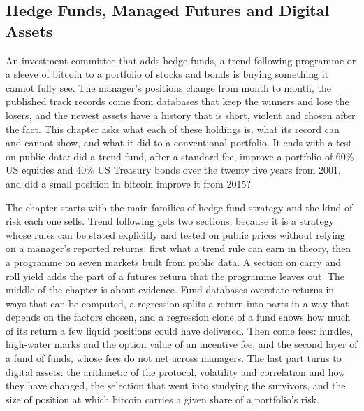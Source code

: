 
\begin{chapterrefs}
\setcounter{chapter}{8}
\chapter{Hedge Funds, Managed Futures and Digital Assets}
\label{ch:hedge}

An investment committee that adds hedge funds, a trend following programme or a sleeve of bitcoin to
a portfolio of stocks and bonds is buying something it cannot fully see. The manager's positions
change from month to month, the published track records come from databases that keep the winners
and lose the losers, and the newest assets have a history that is short, violent and chosen after the
fact. This chapter asks what each of these holdings is, what its record can and cannot show, and what
it did to a conventional portfolio. It ends with a test on public data: did a trend fund, after a
standard fee, improve a portfolio of 60\% US equities and 40\% US Treasury bonds over the twenty five
years from 2001, and did a small position in bitcoin improve it from 2015?

The chapter starts with the main families of hedge fund strategy and the kind of risk each one sells.
Trend following gets two sections, because it is a strategy whose rules can be stated explicitly and
tested on public prices without relying on a manager's reported returns: first what a trend rule can earn in theory, then a programme on seven markets
built from public data. A section on carry and roll yield adds the part of a futures return that the
programme leaves out. The middle of the chapter is about evidence. Fund databases overstate returns in
ways that can be computed, a regression splits a return into parts in a way that depends on the
factors chosen, and a regression clone of a fund shows how much of its return a few liquid positions
could have delivered. Then come fees: hurdles, high-water marks and the option value of an incentive
fee, and the second layer of a fund of funds, whose fees do not net across managers. The last part
turns to digital assets: the arithmetic of the protocol, volatility and correlation and how they have
changed, the selection that went into studying the survivors, and the size of position at which
bitcoin carries a given share of a portfolio's risk.


\end{chapterrefs}
